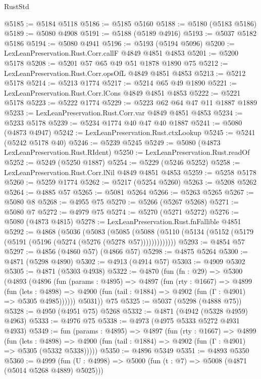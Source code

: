 \begin{lexlean}{RustStd}
\begin{coremodule}
@5185 := @5184 @5118
@5186 := @5185 @5160
@5188 := @5180 (@5183 @5186)
@5189 := @5080 @4908
@5191 := @5188 (@5189 @4916)
@5193 := @5037 @5182 @5186
@5194 := @5080 @4941
@5196 := @5193 (@5194 @5096)
@5200 := LexLeanPreservation.Rust.Corr.callF @4849 @4851 @4853
@5201 := @5200 @5178
@5208 := @5201 @57 @65 @49 @51 @1878 @1890 @75
@5212 := LexLeanPreservation.Rust.Corr.opsOfL @4849 @4851 @4853
@5213 := @5212 @5178
@5214 := @5213 @1774
@5217 := @5214 @65 @49 @1890
@5221 := LexLeanPreservation.Rust.Corr.lCons @4849 @4851 @4853
@5222 := @5221 @5178
@5223 := @5222 @1774
@5229 := @5223 @62 @64 @47 @11 @1887 @1889
@5233 := LexLeanPreservation.Rust.Corr.var @4849 @4851 @4853
@5234 := @5233 @5178
@5239 := @5234 @1774 @40 @47 @40 @1887
@5241 := @5080 (@4873 @4947)
@5242 := LexLeanPreservation.Rust.ctxLookup
@5245 := @5241 (@5242 @5178 @40)
@5246 := @5239 @5245
@5249 := @5080 (@4873 LexLeanPreservation.Rust.RIdent)
@5250 := LexLeanPreservation.Rust.readOf
@5252 := @5249 (@5250 @1887)
@5254 := @5229 (@5246 @5252)
@5258 := LexLeanPreservation.Rust.Corr.lNil @4849 @4851 @4853
@5259 := @5258 @5178
@5260 := @5259 @1774
@5262 := @5217 (@5254 @5260)
@5263 := @5208 @5262
@5264 := @4885 @57
@5265 := @5081 @5264
@5266 := @5263 @5265
@5267 := @5080 @8
@5268 := @4955 @75
@5270 := @5266 (@5267 @5268)
@5271 := @5080 @7
@5272 := @4979 @75
@5274 := @5270 (@5271 @5272)
@5276 := @5080 (@4873 @4815)
@5278 := LexLeanPreservation.Rust.fnFallible @4851
@5292 := @4868
    (@5036
      (@5083
        (@5085
          (@5088 (@5110 (@5134 (@5152 (@5179 (@5191 (@5196 (@5274 (@5276 (@5278 @57)))))))))))))
@5293 := @4854 @57
@5297 := @4856 (@4860 @57) (@4866 @57)
@5298 := @4875 @5264
@5300 := @4871 (@5298 @4890)
@5302 := @4913 (@4914 @57)
@5303 := @4909 @5302
@5305 := @4871 (@5303 @4938)
@5322 := @4870
    (fun (fn : @29) =>
    @5300
      (@4893
        (@4896
          (fun (params : @4895) =>
          @4897
            (fun (rty : @1667) =>
            @4899
              (fun (lets : @4898) =>
              @4900 (fun (tail : @1884) => @4902 (fun (Γ : @4901) => @5305 @4985))))))
        @5031))
    @75
@5325 := @5037 (@5298 (@4888 @75))
@5328 := @4950 (@4951 @75) @5268
@5332 := @4871 (@4942 (@5328 @4959) @4963)
@5333 := @4976 @75
@5338 := @4973 (@4975 @5333 @5272 @4931 @4933)
@5349 := fun (params : @4895) =>
  @4897
    (fun (rty : @1667) =>
    @4899
      (fun (lets : @4898) =>
      @4900 (fun (tail : @1884) => @4902 (fun (Γ : @4901) => @5305 (@5332 @5338)))))
@5350 := @4896 @5349
@5351 := @4893 @5350
@5360 := @4999 (fun (U : @4998) => @5000 (fun (t : @7) => @5008 (@4871 (@5014 @5268 @4889) @5025)))

\end{coremodule}
\end{lexlean}
